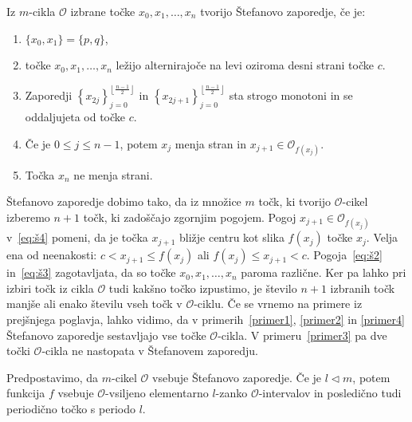 \documentclass[mat2]{fmfdelo}
\begin{document}
\begin{definicija}\label{def:stef}
Iz $m$-cikla $\mathcal{O}$ izbrane točke $x_0, x_1, \dots, x_n$ tvorijo Štefanovo zaporedje, če je:

  \begin{enumerate}[label={(Š\arabic*)}]
    \item $\{x_0, x_1\} = \{p, q\}$, \label{eq:š1}
    \item točke $x_0, x_1, \dots, x_n$ ležijo alternirajoče na levi oziroma desni strani točke $c$. \label{eq:š2}
    \item Zaporedji 
    $\left \{ x_{2j} \right \}_{j=0}^{\left \lfloor \frac{n-1}{2} \right \rfloor}$ 
    in
    $\left \{ x_{2j+1} \right \}_{j=0}^{\left \lfloor \frac{n-1}{2} \right \rfloor}$ sta strogo monotoni in se oddaljujeta od točke $c$. \label{eq:š3}
    \item Če je $0\leq j \leq n-1$, potem $x_j$ menja stran in $x_{j+1} \in \mathcal{O}_{f(x_j)}$.\label{eq:š4}
    \item Točka $x_n$ ne menja strani. \label{eq:š5}
  \end{enumerate}
  
\end{definicija}
\begin{opomba}
Štefanovo zaporedje dobimo tako, da iz množice $m$ točk, ki tvorijo $\mathcal{O}$-cikel izberemo $n+1$ točk, ki zadoščajo zgornjim pogojem. 
Pogoj $x_{j+1} \in \mathcal{O}_{f(x_j)}$ v~\ref{eq:š4} pomeni, da je točka $x_{j+1}$ bližje centru kot slika $f(x_j)$ točke $x_j$. Velja ena od neenakosti: $c < x_{j+1} \leq f(x_j)$ ali $f(x_j) \leq x_{j+1} < c$. 
Pogoja~\ref{eq:š2} in~\ref{eq:š3} zagotavljata, da so točke $x_0, x_1, \dots, x_n$ paroma različne. Ker pa lahko pri izbiri točk iz cikla $\mathcal{O}$ tudi kakšno točko izpustimo, je število $n+1$ izbranih točk manjše ali enako številu vseh točk v $\mathcal{O}$-ciklu. Če se vrnemo na primere iz prejšnjega poglavja, lahko vidimo, da v primerih~\ref{primer1}, \ref{primer2} in \ref{primer4} Štefanovo zaporedje sestavljajo vse točke $\mathcal{O}$-cikla. V primeru~\ref{primer3} pa dve točki $\mathcal{O}$-cikla ne nastopata v Štefanovem zaporedju.
\end{opomba}

\begin{trditev}\label{trd:zap-cikel}
Predpostavimo, da $m$-cikel $\mathcal{O}$ vsebuje Štefanovo zaporedje. Če je $l \triangleleft m$, potem funkcija $f$ vsebuje $\mathcal{O}$-vsiljeno elementarno $l$-zanko $\mathcal{O}$-intervalov in posledično tudi periodično točko s periodo $l$.
\end{trditev}
\end{document}
